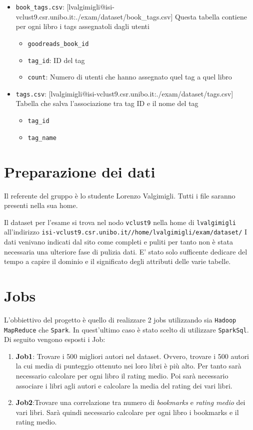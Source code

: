 \documentclass[11pt]{article}
\begin{document}
\begin{itemize}
    \item \texttt{book\_tags.csv}: [lvalgimigli@isi-vclust9.csr.unibo.it:./exam/dataset/book\_tags.csv] Questa tabella contiene per ogni libro i tags assegnatoli dagli utenti
    \begin{itemize}
        \item \texttt{goodreads\_book\_id}
        \item \texttt{tag\_id}: ID del tag
        \item \texttt{count}: Numero di utenti che hanno assegnato quel tag a quel libro
    \end{itemize}
    \item \texttt{tags.csv}: [lvalgimigli@isi-vclust9.csr.unibo.it:./exam/dataset/tags.csv] Tabella che salva l'associazione tra tag ID e il nome del tag
    \begin{itemize}
        \item \texttt{tag\_id}
        \item \texttt{tag\_name}
    \end{itemize}
\end{itemize}



\section{Preparazione dei dati}

Il referente del gruppo è lo studente Lorenzo Valgimigli. Tutti i file saranno presenti nella sua home.

Il dataset per l'esame si trova nel nodo \texttt{vclust9} nella home di \texttt{lvalgimigli} %
all'indirizzo \texttt{isi-vclust9.csr.unibo.it//home/lvalgimigli/exam/dataset/}
I dati venivano indicati dal sito come completi e puliti per tanto non è stata necessaria una ulteriore fase di
pulizia dati. E' stato solo sufficente dedicare del tempo a capire il dominio e il significato degli attributi
delle varie tabelle.


\section{Jobs}

L'obbiettivo del progetto è quello di realizzare 2 jobs utilizzando sia \texttt{Hadoop MapReduce} che
\texttt{Spark}. In quest'ultimo caso è stato scelto di utilizzare \texttt{SparkSql}. Di seguito
vengono esposti i Job:
    \begin{enumerate}
        \item \textbf{Job1}: Trovare i 500 migliori autori nel dataset. Ovvero, trovare i 500 autori la cui media di punteggio
            ottenuto nei loro libri è più alto. Per tanto sarà necessario calcolare per ogni libro il rating medio.
            Poi sarà necessario associare i libri agli autori e calcolare la media del rating dei vari libri.
        \item \textbf{Job2}:Trovare una correlazione tra numero di \textit{bookmarks} e \textit{rating medio} dei vari libri.
        Sarà quindi necessario calcolare per ogni libro i bookmarks e il rating medio.
    \end{enumerate}
\end{document}
